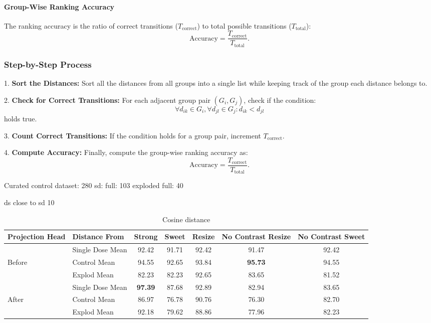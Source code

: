 \paragraph{Group-Wise Ranking Accuracy}
The ranking accuracy is the ratio of correct transitions (\( T_{\text{correct}} \)) to total possible transitions (\( T_{\text{total}} \)):
\[
\text{Accuracy} = \frac{T_{\text{correct}}}{T_{\text{total}}}.
\]

\subsubsection*{Step-by-Step Process}

1. \textbf{Sort the Distances:} Sort all the distances from all groups into a single list while keeping track of the group each distance belongs to.

2. \textbf{Check for Correct Transitions:} For each adjacent group pair \( (G_i, G_j) \), check if the condition:
\[
\forall d_{ik} \in G_i, \forall d_{jl} \in G_j : d_{ik} < d_{jl}
\]
holds true.

3. \textbf{Count Correct Transitions:} If the condition holds for a group pair, increment \( T_{\text{correct}} \).

4. \textbf{Compute Accuracy:} Finally, compute the group-wise ranking accuracy as:
\[
\text{Accuracy} = \frac{T_{\text{correct}}}{T_{\text{total}}}.
\]






Curated control dataset: 280
sd: full: 103
exploded full: 40

ds close to sd 10

\begin{table}[H]
  \centering
  \begin{tabular}{@{}llccccc@{}}
  \toprule
  Projection Head & Distance From      & Strong & Sweet & Resize & No Contrast Resize & No Contrast Sweet \\ \midrule
                  & Single Dose Mean   & 92.42      & 91.71     & 92.42      & 91.47                  & 92.42                 \\
  Before          & Control Mean       & 94.55      & 92.65     & 93.84      & \textbf{95.73}                  & 94.55                 \\
                  & Explod Mean        & 82.23      & 82.23     & 92.65     & 83.65                  & 81.52                \\ \midrule
                  & Single Dose Mean   & \textbf{97.39}  & 87.68     & 92.89     & 82.94                  & 83.65                 \\
  After           & Control Mean       & 86.97      & 76.78    & 90.76      & 76.30                 & 82.70                 \\
                  & Explod Mean        & 92.18      & 79.62    & 88.86      & 77.96                  & 82.23                 \\ \bottomrule
  \end{tabular}
  \caption{Cosine distance}
  \label{tab:your_table_label}
\end{table}


